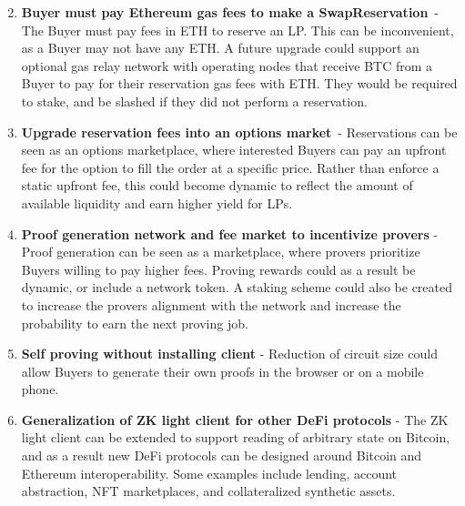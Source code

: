 \documentclass[
]{article}
\providecommand{\tightlist}{%
  \setlength{\itemsep}{0pt}\setlength{\parskip}{0pt}}
\begin{document}
{{{}

\begin{enumerate}
\setcounter{enumi}{1}
\tightlist
\item
  \textbf{Buyer must pay Ethereum gas fees to make a SwapReservation}{~- The
  Buyer must pay fees in ETH to reserve an LP. This can be inconvenient,
  as a Buyer may not have any ETH. A future upgrade could support an
  optional gas relay network with operating nodes that receive BTC from
  a Buyer to pay for their reservation gas fees with ETH. They would be
  required to stake, and be slashed if they did not perform a
  reservation.}
\end{enumerate}

{}

\begin{enumerate}
\setcounter{enumi}{2}
\tightlist
\item
  \textbf{Upgrade reservation fees into an options market}{~- Reservations can
  be seen as an options marketplace, where interested Buyers can pay an
  upfront fee for the option to fill the order at a specific price.
  Rather than enforce a static upfront fee, this could become dynamic to
  reflect the amount of available liquidity and earn higher yield for
  LPs.}
\end{enumerate}

{}

\begin{enumerate}
\setcounter{enumi}{3}
\tightlist
\item
  \textbf{Proof generation network and fee market to incentivize provers }{- Proof generation can be seen as a marketplace, where provers
  prioritize Buyers willing to pay higher fees. Proving rewards could as
  a result be dynamic, or include a network token. A staking scheme
  could also be created to increase the provers alignment with the
  network and increase the probability to earn the next proving job.}
\end{enumerate}

{}

\begin{enumerate}
\setcounter{enumi}{4}
\tightlist
\item
  \textbf{Self proving without installing client }{- Reduction of circuit size
  could allow Buyers to generate their own proofs in the browser or on a
  mobile phone.}
\end{enumerate}

{}

\begin{enumerate}
\setcounter{enumi}{5}
\tightlist
\item
  \textbf{Generalization of ZK light client for other DeFi protocols }{- The ZK
  light client can be extended to support reading of arbitrary state on
  Bitcoin, and as a result new DeFi protocols can be designed around
  Bitcoin and Ethereum interoperability. Some examples include lending,
  account abstraction, NFT marketplaces, and collateralized synthetic
  assets.}
\end{enumerate}

}}
\end{document}
